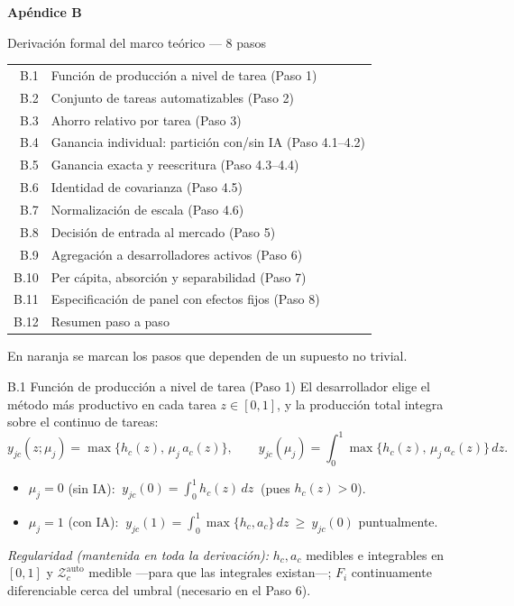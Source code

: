 \documentclass[10pt,aspectratio=169]{beamer}
\begin{document}
{
\begin{frame}[plain]
\vfill
\centering
\color{white}
{\Huge\bfseries Apéndice B}\par
\vspace{0.5em}
{\Large Derivación formal del marco teórico --- 8 pasos}\par
\vfill
\footnotesize
\begin{tabular}{rl}
B.1 & Función de producción a nivel de tarea (Paso 1) \\
B.2 & Conjunto de tareas automatizables (Paso 2) \\
B.3 & Ahorro relativo por tarea (Paso 3) \\
B.4 & Ganancia individual: partición con/sin IA (Paso 4.1--4.2) \\
B.5 & Ganancia exacta y reescritura (Paso 4.3--4.4) \\
B.6 & Identidad de covarianza (Paso 4.5) \\
B.7 & Normalización de escala (Paso 4.6) \\
B.8 & Decisión de entrada al mercado (Paso 5) \\
B.9 & Agregación a desarrolladores activos (Paso 6) \\
B.10 & Per cápita, absorción y separabilidad (Paso 7) \\
B.11 & Especificación de panel con efectos fijos (Paso 8) \\
B.12 & Resumen paso a paso \\
\end{tabular}
\vfill
\footnotesize\color{white} En \textcolor{orange!80!white}{naranja} se marcan los pasos que dependen de un supuesto no trivial.
\vfill
\end{frame}
}

\begin{frame}{B.1 Función de producción a nivel de tarea (Paso 1)}
\small
El desarrollador elige el método más productivo en cada tarea $z\in[0,1]$, y la producción total integra sobre el continuo de tareas:
\[
y_{jc}(z;\mu_j)=\max\{h_c(z),\,\mu_j\,a_c(z)\},
\qquad
y_{jc}(\mu_j)=\int_0^1\max\{h_c(z),\,\mu_j\,a_c(z)\}\,dz.
\]
\begin{itemize}\small
  \item $\mu_j=0$ (sin IA): $\ y_{jc}(0)=\int_0^1 h_c(z)\,dz\ $ (pues $h_c(z)>0$).
  \item $\mu_j=1$ (con IA): $\ y_{jc}(1)=\int_0^1\max\{h_c,a_c\}\,dz\ \ge\ y_{jc}(0)$ puntualmente.
\end{itemize}
\medskip
{\footnotesize\textit{Regularidad (mantenida en toda la derivación):} $h_c,a_c$ medibles e integrables en $[0,1]$ y $\mathcal{Z}^{\mathrm{auto}}_c$ medible ---para que las integrales existan---; $F_i$ continuamente diferenciable cerca del umbral (necesario en el Paso 6).}
\end{frame}
\end{document}

